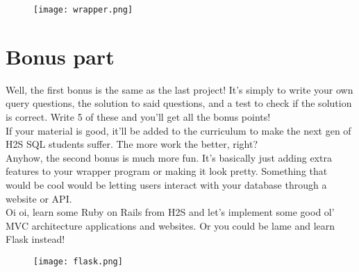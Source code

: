 \documentclass{42-en}
\begin{document}
	\begin{figure}[H]
		\begin{center}
			\texttt{[image: wrapper.png]}
		\end{center}
	\end{figure}

\nextexercice


\chapter{Bonus part}
	Well, the first bonus is the same as the last project! It's simply to write your 
	own query questions, the solution to said questions, and a test to check if the 
	solution is correct. Write 5 of these and you'll get all the bonus points! \\ 

	If your material is good, it'll be added to the curriculum to make the 
	next gen of H2S SQL students suffer. The more work the better, right? \\ 

	Anyhow, the second bonus is much more fun. It's basically just adding extra 
	features to your wrapper program or making it look pretty. Something that would be 
	cool would be letting users interact with your database through a website or API. \\ 

	Oi oi, learn some Ruby on Rails from H2S and let's implement some good ol' MVC 
	architecture applications and websites. Or you could be lame and learn Flask instead! 

	\begin{figure}[H]
		\begin{center}
			\texttt{[image: flask.png]}
		\end{center}
	\end{figure}

\end{document}
